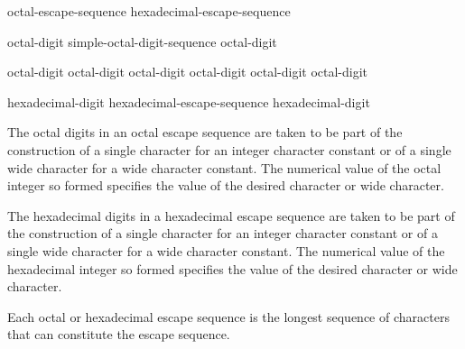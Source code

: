 \documentclass{wg21}
\begin{document}
\begin{bnf}
    \br
    octal-escape-sequence\br
    hexadecimal-escape-sequence
\end{bnf}

\begin{addedblock}
    \begin{bnf}
        \br
        octal-digit\br
        simple-octal-digit-sequence octal-digit
    \end{bnf}
\end{addedblock}

\begin{bnf}
    \br
    \terminal{\textbackslash} octal-digit\br
    \terminal{\textbackslash} octal-digit octal-digit\br
    \terminal{\textbackslash} octal-digit octal-digit octal-digit\br
\end{bnf}

\begin{bnf}
    \br
     hexadecimal-digit\br
    hexadecimal-escape-sequence hexadecimal-digit\br
\end{bnf}


The octal digits  in an octal escape sequence are taken to be part of the
construction of a single character for an integer character constant or of a single wide character for a
wide character constant. The numerical value of the octal integer so formed specifies the value of
the desired character or wide character.

The hexadecimal digits  in a hexadecimal escape sequence
are taken to be part of the construction of a single character for an integer character constant or of a
single wide character for a wide character constant. The numerical value of the hexadecimal integer
so formed specifies the value of the desired character or wide character.

Each octal or hexadecimal escape sequence is the longest sequence of characters that can constitute
the escape sequence.
\end{document}
